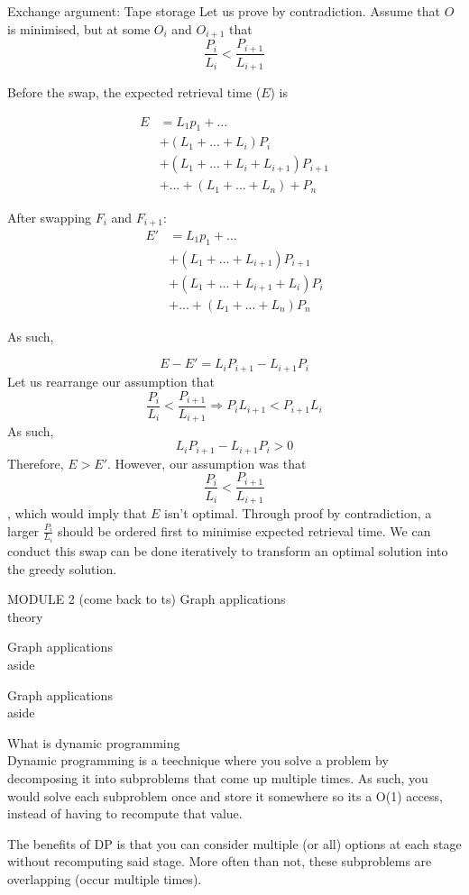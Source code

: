 \documentclass[journal, letterpaper]{IEEEtran}
\begin{document}
\begin{example}{Exchange argument: Tape storage}
    Let us prove by contradiction. Assume that $O$ is minimised, but at some $O_i$ and
    $O_{i+1}$ that $$\frac{P_i}{L_i} < \frac{P_{i+1}}{L_{i+1}}$$

    Before the swap, the expected retrieval time ($E$) is

    \begin{align*}
        E &= L_1 p_1 + ... \\
          &+ (L_1 + ... + L_i) P_i \\
          &+ (L_1 + ... + L_i + L_{i+1}) P_{i+1}\\
          &+ ... + (L_1 + ... + L_n) + P_n
    \end{align*}

    After swapping $F_i$ and $F_{i+1}$:
    \begin{align*}
        E' &= L_1 p_1 + ... \\
           &+ (L_1 + ... + L_{i+1}) P_{i+1}\\
           &+ (L_1 + ... + L_{i+1} + L_i )P_i \\
           &+ ... + (L_1 + ... + L_n) P_n
    \end{align*}

    As such, 

    $$E - E' = L_i P_{i + 1} - L_{i+1} P_i$$
    Let us rearrange our assumption that 
    $$\frac{P_i}{L_i} < \frac{P_{i+1}}{L_{i+1}} \Rightarrow P_i L_{i+1} < P_{i+1} L_i$$
    As such, 
    $$L_i P_{i + 1} - L_{i+1} P_i > 0$$
    Therefore, $E > E'$. However, our assumption was that 
    $$\frac{P_i}{L_i} < \frac{P_{i+1}}{L_{i+1}}$$, which would imply that $E$ isn't
    optimal. Through proof by contradiction, a larger $\frac{P_i}{L_i}$ should be ordered
    first to minimise expected retrieval time. We can conduct this swap can be done
    iteratively to transform an optimal solution into the greedy solution.
\end{example}

\begin{theory}{MODULE 2 (come back to ts) Graph applications}\\
    theory
\end{theory}
\begin{aside}{Graph applications}\\
    aside
\end{aside}
\begin{example}{Graph applications}\\
    aside
\end{example}

\begin{theory}{What is dynamic programming}\\
    Dynamic programming is a teechnique where you solve a problem by decomposing it into 
    subproblems that come up multiple
    times. As such, you would solve each subproblem once and store it somewhere so its a
    O(1) access, instead of having to recompute that value.

    The benefits of DP is that you can consider multiple (or all) options at each stage
    without recomputing said stage. More often than not, these subproblems are overlapping
    (occur multiple times).
\end{theory}
\end{document}
